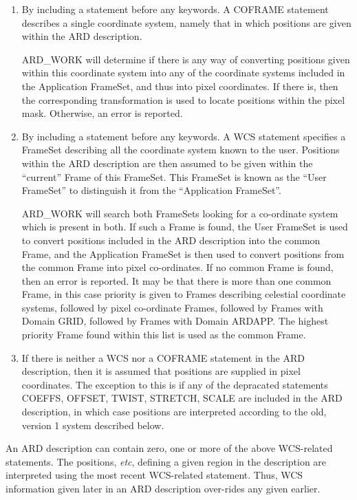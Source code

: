 \begin{enumerate}
\item By including a  statement before any
keywords. A COFRAME statement describes a single coordinate system,
namely that in which positions are given within the ARD description.

ARD\_WORK will determine if there is any way of converting positions
given within this coordinate system into any of the coordinate systems
included in the Application FrameSet, and thus into pixel coordinates.
If there is, then the corresponding transformation is used to locate
positions within the pixel mask. Otherwise, an error is reported.

\item By including a  statement before any
keywords. A WCS statement specifies a FrameSet describing all the
coordinate system known to the user. Positions within the ARD description
are then assumed to be given within the ``current'' Frame of this
FrameSet. This FrameSet is known as the ``User FrameSet'' to distinguish
it from the ``Application FrameSet''.

ARD\_WORK will search both FrameSets looking for a co-ordinate system
which is present in both. If such a Frame is found, the User FrameSet is
used to convert positions included in the ARD description into the common
Frame, and the Application FrameSet is then used to convert positions
from the common Frame into pixel co-ordinates. If no common Frame is
found, then an error is reported. It may be that there is more than one
common Frame, in this case priority is given to Frames describing
celestial coordinate systems, followed by pixel co-ordinate Frames,
followed by Frames with Domain GRID, followed by Frames with Domain
ARDAPP. The highest priority Frame found within this list is used as the
common Frame.

\item If there is neither a WCS nor a COFRAME statement in the ARD
description, then it is assumed that positions are supplied in pixel
coordinates. The exception to this is if any of the depracated statements
COEFFS, OFFSET, TWIST, STRETCH, SCALE are included in the ARD description,
in which case positions are interpreted according to the old, version 1 system 
described below.

\end{enumerate}

An ARD description can contain zero, one or more of the above WCS-related 
statements. The positions, {\em etc}, defining a given region in the
description are interpreted using the most recent WCS-related statement.
Thus, WCS information given later in an ARD description over-rides any
given earlier.


